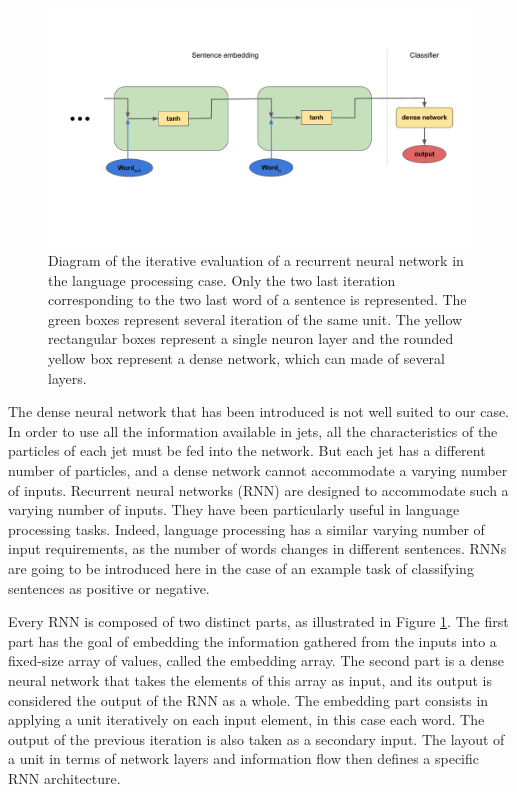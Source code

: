 \begin{figure}
    \centering
    \includegraphics[width=\textwidth]{Images/Schema_RNN.pdf}
    \caption{Diagram of the iterative evaluation of a recurrent neural network in the language processing case. Only the two last iteration corresponding to the two last word of a sentence is represented. The green boxes represent several iteration of the same unit. The yellow rectangular boxes represent a single neuron layer and the rounded yellow box represent a dense network, which can made of several layers.}
    \label{fig:recurrent_network}
\end{figure}

The dense neural network that has been introduced is not well suited to our case. In order to use all the information available in jets, all the characteristics of the particles of each jet must be fed into the network. But each jet has a different number of particles, and a dense network cannot accommodate a varying number of inputs. Recurrent neural networks (RNN) are designed to accommodate such a varying number of inputs. They have been particularly useful in language processing tasks. Indeed, language processing has a similar varying number of input requirements, as the number of words changes in different sentences. RNNs are going to be introduced here in the case of an example task of classifying sentences as positive or negative.

Every RNN is composed of two distinct parts, as illustrated in Figure \ref{fig:recurrent_network}. The first part has the goal of embedding the information gathered from the inputs into a fixed-size array of values, called the embedding array. The second part is a dense neural network that takes the elements of this array as input, and its output is considered the output of the RNN as a whole. The embedding part consists in applying a unit iteratively on each input element, in this case each word. The output of the previous iteration is also taken as a secondary input. The layout of a unit in terms of network layers and information flow then defines a specific RNN architecture.

